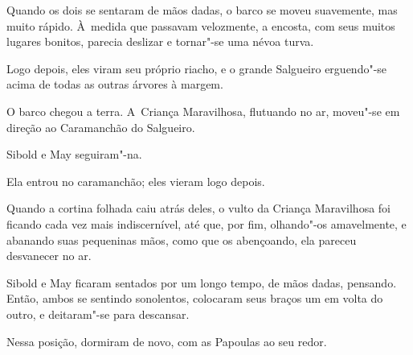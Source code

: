 Quando os dois se sentaram de mãos dadas, o barco se moveu suavemente,
mas muito rápido. À~medida que passavam velozmente, a encosta, com seus
muitos lugares bonitos, parecia deslizar e tornar"-se uma névoa turva.

Logo depois, eles viram seu próprio riacho, e o grande Salgueiro
erguendo"-se acima de todas as outras árvores à margem.

O barco chegou a terra. A~Criança Maravilhosa, flutuando no ar, moveu"-se
em direção ao Caramanchão do Salgueiro.

Sibold e May seguiram"-na.

Ela entrou no caramanchão; eles vieram logo depois.

Quando a cortina folhada caiu atrás deles, o vulto da Criança
Maravilhosa foi ficando cada vez mais indiscernível, até que, por fim,
olhando"-os amavelmente, e abanando suas pequeninas mãos, como que os
abençoando, ela pareceu desvanecer no ar.

\smallskip

Sibold e May ficaram sentados por um longo tempo, de mãos dadas,
pensando. Então, ambos se sentindo sonolentos, colocaram seus braços um
em volta do outro, e deitaram"-se para descansar.

\smallskip

Nessa posição, dormiram de novo, com as Papoulas ao seu redor.
